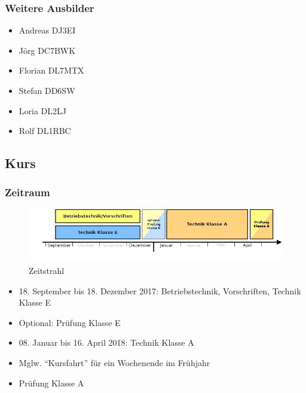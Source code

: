 \begin{frame}
  \frametitle{Weitere Ausbilder}

  \begin{itemize}
    \item Andreas DJ3EI
    \item Jörg DC7BWK
    \item Florian DL7MTX
    \item Stefan DD6SW
    \item Loria DL2LJ
    \item Rolf DL1RBC
  \end{itemize}
\end{frame}


\subsection{Kurs}

\begin{frame}
  \frametitle{Zeitraum}

  \begin{center}
    \begin{figure}
      \includegraphics[height=.35\textheight,width=\textwidth,keepaspectratio]{o00/Zeitstrahl_D23_2017.png}
      \caption{Zeitstrahl}
    \end{figure}
  \end{center}

  \begin{itemize}
    \item 18. September bis 18. Dezember 2017: Betriebstechnik, Vorschriften, Technik Klasse E
    \item Optional: Prüfung Klasse E
    \item 08. Januar bis 16. April 2018: Technik Klasse A
    \item Mglw. “Kursfahrt” für ein Wochenende im Frühjahr
    \item Prüfung Klasse A
  \end{itemize}
\end{frame}

